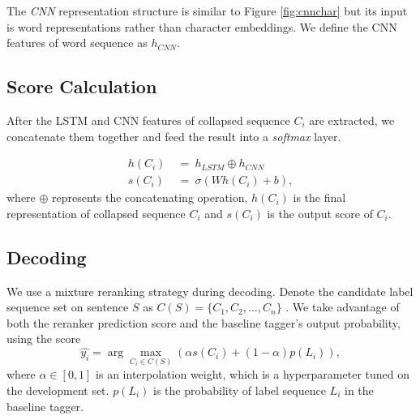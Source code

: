 \documentclass[11pt,a4paper]{article}
\begin{document}
The \textit{CNN} representation structure is similar to Figure \ref{fig:cnnchar} but its input is word representations rather than character embeddings. We define the CNN features of word sequence as $h_{CNN}$.

\subsection{Score Calculation}
After the LSTM and CNN features of collapsed sequence $C_i$ are extracted, we concatenate them together and feed the result into a \textit{softmax} layer.

\begin{equation}
\begin{aligned}
h(C_i) & \:=\:h_{LSTM}\oplus h_{CNN}\\
s(C_i) & \:= \: \sigma(W h(C_i)  + b) ,
\end{aligned}
\end{equation}
where $\oplus$ represents the concatenating operation, $h(C_i)$ is the final representation of collapsed sequence $C_i$ and $s(C_i)$ is the output score of $C_i$.

\subsection{Decoding}
We use a mixture reranking strategy during decoding. Denote the candidate label sequence set on sentence $S$ as $C(S) = \{C_1,C_2,...,C_n\}$ . We take advantage of both the reranker prediction score and the baseline tagger's output probability, using the score
\begin{equation}
\label{equ:mixture}
\hat{y_i} = \arg\max_{C_i\in C(S)} (\alpha s(C_i) + (1-\alpha)p(L_i)),
\end{equation}
where $\alpha \in [0,1]$ is an interpolation weight, which is a hyperparameter tuned on the development set. $p(L_i)$ is the probability of label sequence $L_i$ in the baseline tagger.


\begin{table}[t]
\begin{center}
\end{center}
\caption{Hyperparameters of reranker.}
\label{tab:hyperparameter}
\end{table}
\end{document}
